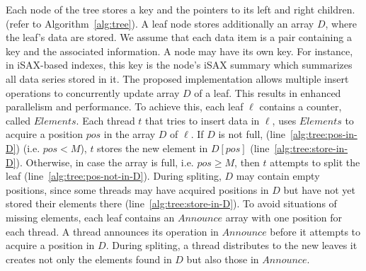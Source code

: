 \documentclass[a4paper,11pt,twoside,openany]{book}
\begin{document}
    Each node of the tree stores a key and the pointers
    to its left and right children.  (refer to Algorithm~\ref{alg:tree}).
    A leaf node stores additionally an array $D$, where the leaf's data are stored. 
    We assume that each data item is a pair containing a key and the associated information.
    A node may have its own key. For instance, in iSAX-based indexes, this key is the node's
    iSAX summary which summarizes all data series stored in it.
    The proposed implementation allows multiple insert operations to concurrently update array
    $D$ of a leaf. This results in enhanced parallelism and performance. 
    To achieve this, each leaf $\ell$ contains a counter, called $\mathit{Elements}$.
    Each thread $\mathit{t}$ that tries to insert data in $\ell$, uses
    $\mathit{Elements}$ to acquire a position $\mathit{pos}$ in the array $D$ of $\ell$.
    If $D$ is not full, (line~\ref{alg:tree:pos-in-D}) (i.e. $\mathit{pos} < M$), 
    $\mathit{t}$ stores the new element in $D[\mathit{pos}]$ (line~\ref{alg:tree:store-in-D}).
    Otherwise, in case the array is full, i.e. $\mathit{pos \geq M}$, then 
    $\mathit{t}$ attempts to split the leaf (line~\ref{alg:tree:pos-not-in-D}). 
    During spliting, $D$ may contain empty positions, since some
    threads may have acquired positions in $D$ but have not yet stored their
    elements there (line~\ref{alg:tree:store-in-D}).
    To avoid situations of missing elements, each leaf contains an $\mathit{Announce}$ array 
    with one position for each thread. A thread announces its operation
    in $\mathit{Announce}$ before it attempts to acquire a position in $D$.
    During spliting, a thread distributes to the new leaves it creates not only the
    elements found in $D$ but also those in $\mathit{Announce}$.

\end{document}

